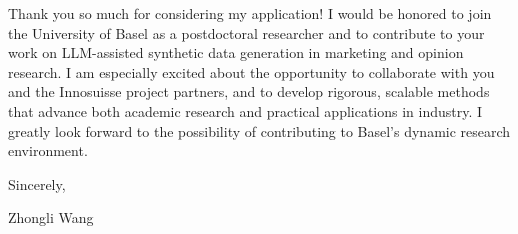 \documentclass{nfr}
\begin{document}
Thank you so much for considering my application! 
I would be honored to join the University of Basel as a postdoctoral researcher and to contribute to your work on LLM-assisted synthetic data generation in marketing and opinion research. 
I am especially excited about the opportunity to collaborate with you and the Innosuisse project partners, and to develop rigorous, scalable methods that advance both academic research and practical applications in industry. 
I greatly look forward to the possibility of contributing to Basel’s dynamic research environment.
\vspace{3mm}

\noindent Sincerely,\\
\vspace{10mm}

\noindent Zhongli Wang

\vspace{5mm}



\end{document}
